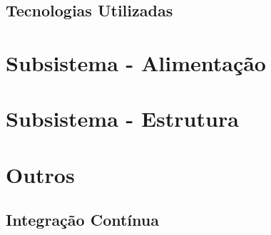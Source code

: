 \subsection{Tecnologias Utilizadas}

\section{Subsistema - Alimentação}

\section{Subsistema - Estrutura}

\section{Outros}

\subsection{Integração Contínua}
